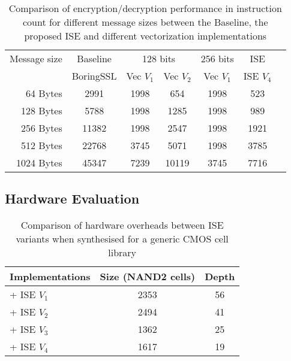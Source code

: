 \begin{table}
\caption{Comparison of encryption/decryption performance in instruction count for different message sizes between the Baseline, the proposed ISE and different vectorization implementations}
\label{tab:res:sw:perf}
\begin{tabular}{rcccccc}
\toprule             
Message size & Baseline  & \multicolumn{2}{c}{128 bits} & 256 bits  &   ISE       \\
             & BoringSSL & Vec $V_1$   &   Vec $V_2$    & Vec $V_1$ &   ISE $V_4$ \\
\midrule
  64 Bytes   &    2991   &    1998     &       654      &    1998   &   523       \\
 128 Bytes   &    5788   &    1998     &      1285      &    1998   &   989       \\
 256 Bytes   &   11382   &    1998     &      2547      &    1998   &  1921       \\
 512 Bytes   &   22768   &    3745     &      5071      &    1998   &  3785       \\
1024 Bytes   &   45347   &    7239     &     10119      &    3745   &  7716       \\
\bottomrule
\end{tabular}
\end{table}

\subsection{Hardware Evaluation}

\begin{table}
\caption{Comparison of hardware overheads between ISE variants when synthesised for a
generic CMOS cell library}
\label{tab:res:sw:hardcost1}
\begin{tabular}{lcc}
\toprule            
Implementations        & Size (NAND2 cells)    & Depth  \\

\midrule
           + ISE $V_1$ &     2353     & 56   \\
           + ISE $V_2$ &     2494     & 41   \\
           + ISE $V_3$ &     1362     & 25   \\
           + ISE $V_4$ &     1617     & 19   \\

\bottomrule
\end{tabular}
\end{table}

